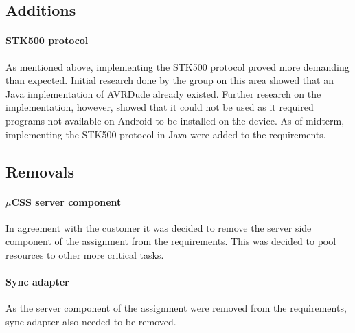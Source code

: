 \subsection{Additions}
\paragraph{STK500 protocol} As mentioned above, implementing the STK500 protocol proved more demanding than expected. Initial research done by the group on this area showed that an Java implementation of AVRDude already existed. Further research on the implementation, however, showed that it could not be used as it required programs not available on Android to be installed on the device. As of midterm, implementing the STK500 protocol in Java were added to the requirements.

\subsection{Removals}
\paragraph{$\mu$CSS server component} In agreement with the customer it was decided to remove the server side component of the assignment from the requirements. This was decided to pool resources to other more critical tasks.

\paragraph{Sync adapter} As the server component of the assignment were removed from the requirements, sync adapter also needed to be removed.

